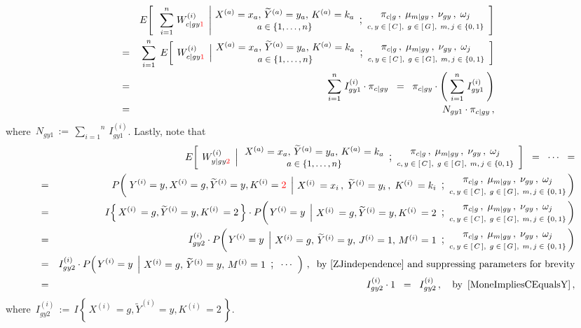 \begin{enumerate}
\begin{eqnarray*}
	&&
		E\!\left[\;\;
			\left.
			\overset{n}{\underset{i=1}{\sum}} \; W^{(i)}_{c \vert gy{\color{red}1}}
			\,\;\right\vert
			\!\!
			\begin{array}{c} X^{(a)} = x_{a},\, \widetilde{Y}^{(a)} = y_{a},\, K^{(a)} = k_{a} \\ \textnormal{\small$a\in\{1,\ldots,n\}$} \end{array} \textnormal{\large;} \begin{array}{c} \pi_{c \vert g}\,, \; \mu_{m \vert gy}\,, \; \nu_{gy}\,, \; \omega_{j} \\ \textnormal{\scriptsize$c,y\in[\,C\,], \; g\in[\,G\,], \; m,j\in\{0,1\}$} \end{array}
		\right]
	\\
	&=&
		\overset{n}{\underset{i=1}{\sum}} \;\,
		E\!\left[\;
			\left.
			W^{(i)}_{c \vert gy{\color{red}1}}
			\,\;\right\vert
			\!\!
			\begin{array}{c} X^{(a)} = x_{a},\, \widetilde{Y}^{(a)} = y_{a},\, K^{(a)} = k_{a} \\ \textnormal{\small$a\in\{1,\ldots,n\}$} \end{array} \textnormal{\large;} \begin{array}{c} \pi_{c \vert g}\,, \; \mu_{m \vert gy}\,, \; \nu_{gy}\,, \; \omega_{j} \\ \textnormal{\scriptsize$c,y\in[\,C\,], \; g\in[\,G\,], \; m,j\in\{0,1\}$} \end{array}
		\right]
	\\
	&=&
		\overset{n}{\underset{i=1}{\sum}} \;
		I^{(i)}_{gy1} \cdot \pi_{c \vert gy}
	\;\; = \;\; 
		\pi_{c \vert gy}
		\cdot
		\left(\; \overset{n}{\underset{i=1}{\sum}} \; I^{(i)}_{gy1} \;\right)
	\\
	&=&
		N_{gy1} \cdot \pi_{c \vert gy}\,,
	\end{eqnarray*}
	where \,$N_{gy1} \,:=\, \overset{n}{\underset{i=1}{\sum}} \, I^{(i)}_{gy1}$.
	Lastly, note that
	\begin{eqnarray*}
	&&
		E\!\left[\;
			\left.
			W^{(i)}_{y \vert gy{\color{red}2}}
			\,\;\right\vert
			\EMConditionsWithValues
		\right]
		\;\; = \;\; \cdots \;\; =
	\\
	&=&
		P\!\left(\,
			\left.
			Y^{(i)} = y, X^{(i)} = g, \widetilde{Y}^{(i)} = y, K^{(i)} = {\color{red}2}
			\,\;\right\vert
			\!\!
			\ithEMConditionsWithValues
		\!\!\right)
	\\
	&=&
		I\!\left\{\,X^{(i)}\,=g , \widetilde{Y}^{(i)}=y , K^{(i)}\,=2\,\right\}
		\cdot
		P\!\left(
			\left.
			Y^{(i)} = y
			\,\;\right\vert
			\!\!
			\ithGYTwoEMConditionsWithValues
		\!\!\right)
	\\
	&=&
		I^{(i)}_{gy2}
		\cdot
		P\!\left(
			\left.
			Y^{(i)} = y
			\,\;\right\vert
			\!\!
			\begin{array}{c}
				X^{(i)} = g,\, \widetilde{Y}^{(i)} = y,\, J^{(i)} = 1,\, M^{(i)} = 1
			\end{array}
			\textnormal{\large;}
			\modelParameters
		\!\!\right)
	\\
	&=&
		I^{(i)}_{gy2}
		\cdot
		P\!\left(
			\left.
			Y^{(i)} = y
			\,\;\right\vert
			\!\!
			\begin{array}{c}
				X^{(i)} = g,\, \widetilde{Y}^{(i)} = y,\, M^{(i)} = 1
			\end{array}
			\textnormal{\large;}
			\;\;\cdots\;\;
		\right)\,,
		\;\;
		\textnormal{by \eqref{ZJindependence} and suppressing parameters for brevity}
	\\
	&=&
		I^{(i)}_{gy2} \cdot 1
		\;\; = \;\;
		I^{(i)}_{gy2}\,,
		\quad
		\textnormal{by \,\eqref{MoneImpliesCEqualsY}}\,,
	\end{eqnarray*}
	where \,$I^{(i)}_{gy2} \,:=\, I\!\left\{\,X^{(i)}\,=g , \widetilde{Y}^{(i)}=y , K^{(i)}\,=2\,\right\}$.

\end{enumerate}

